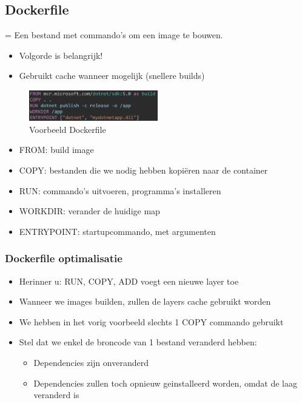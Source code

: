 \documentclass{article}
\begin{document}
\subsection{Dockerfile}

= Een bestand met commando's om een image te bouwen.

\begin{itemize}
    \item Volgorde is belangrijk!
    \item Gebruikt cache wanneer mogelijk (snellere builds)
\end{itemize}

\begin{figure}[H]
    \centering
    \includegraphics[width=0.5\textwidth]{dockerfile.png}
    \caption{Voorbeeld Dockerfile}
\end{figure}

\begin{itemize}
    \item FROM: build image
    \item COPY: bestanden die we nodig hebben kopiëren naar de container
    \item RUN: commando's uitvoeren, programma's installeren
    \item WORKDIR: verander de huidige map
    \item ENTRYPOINT: startupcommando, met argumenten
\end{itemize}

\subsubsection{Dockerfile optimalisatie}

\begin{itemize}
    \item Herinner u: RUN, COPY, ADD voegt een nieuwe layer toe
    \item Wanneer we images builden, zullen de layers cache gebruikt worden
    \item We hebben in het vorig voorbeeld slechts 1 COPY commando gebruikt
    \item Stel dat we enkel de broncode van 1 bestand veranderd hebben:
    \begin{itemize}
        \item Dependencies zijn onveranderd
        \item Dependencies zullen toch opnieuw geinstalleerd worden, omdat de laag veranderd is
    \end{itemize}
\end{itemize}
\end{document}
